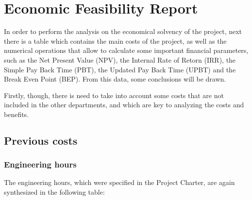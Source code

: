 \section{Economic Feasibility Report}

In order to perform the analysis on the economical solvency of the project, next there is a table which contains the main costs of the project, as well as the numerical operations that allow to calculate some important financial parameters, such as the Net Present Value (NPV), the Internal Rate of Retorn (IRR), the Simple Pay Back Time (PBT), the Updated Pay Back Time (UPBT) and the Break Even Point (BEP). From this data, some conclusions will be drawn.

Firstly, though, there is need to take into account some costs that are not included in the other departments, and which are key to analyzing the costs and benefits. 
\subsection{Previous costs}
\subsubsection{Engineering hours}
The engineering hours, which were specified in the Project Charter, are again synthesized in the following table:


